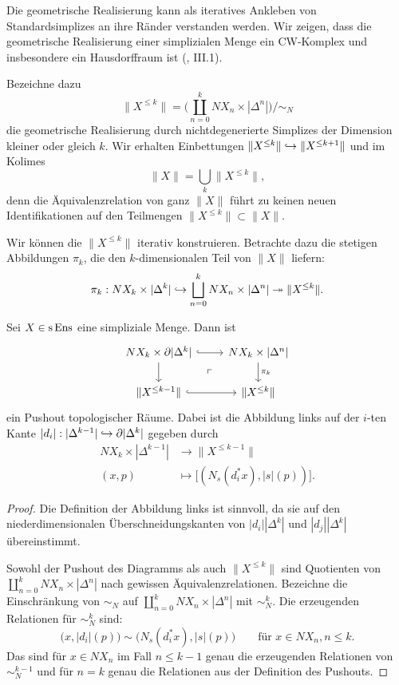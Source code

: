 Die geometrische Realisierung kann als iteratives Ankleben von
Standardsimplizes an ihre Ränder verstanden werden. Wir zeigen, dass
die geometrische Realisierung einer simplizialen Menge ein CW-Komplex
und insbesondere ein Hausdorffraum ist (\cite{Moer}, III.1).

Bezeichne dazu
\[ \|X^{\leq k}\| =
\bigg( \coprod_{n = 0}^k NX_n \times |\Delta^n| \bigg) \big/ \sim_N \]
die geometrische Realisierung durch nichtdegenerierte Simplizes der
Dimension kleiner oder gleich $k$. Wir erhalten Einbettungen
$\|X^{\leq k}\| \hookrightarrow \|X^{\leq k+1}\|$ und im Kolimes
\[ \|X\| = \bigcup_k \|X^{\leq k}\|, \]
denn die Äquivalenzrelation von ganz $\|X\|$ führt zu keinen neuen
Identifikationen auf den Teilmengen $\|X^{\leq k}\| \subset \|X\|$.

Wir können die $\|X^{\leq k}\|$ iterativ konstruieren. Betrachte dazu
die stetigen Abbildungen $\pi_k$, die den $k$-dimensionalen Teil von
$\|X\|$ liefern:
\[ \pi_k: NX_k \times |\Delta^k|
  \hookrightarrow \bigsqcup_{n=0}^k NX_n \times |\Delta^n|
  \twoheadrightarrow \|X^{\leq k}\|. \]

\begin{prop}
  Sei $X \in \operatorname{s}\operatorname{Ens}$ eine simpliziale Menge. Dann ist
  \[ \begin{tikzcd}
    NX_k \times \del |\Delta^k| \arrow[r, hook] \arrow[d]
    \arrow[dr, phantom, "\ulcorner"]
    & NX_k \times |\Delta^n| \arrow[d, "\pi_k"] \\
    \|X^{\leq k-1}\| \arrow[r, hook]
    & \|X^{\leq k}\|
  \end{tikzcd} \]
  ein Pushout topologischer Räume. Dabei ist die Abbildung links auf
  der $i$-ten Kante $|d_i|: |\Delta^{k-1}| \hookrightarrow \partial |\Delta^k|$
  gegeben durch
  \begin{align*}
    NX_k \times |\Delta^{k-1}| &\to \|X^{\leq k-1}\| \\
    (x, p) &\mapsto \big[ (N_s(d_i^* x), |s|(p)) \big].
  \end{align*}
\end{prop}
\begin{proof}
  Die Definition der Abbildung links ist sinnvoll, da sie auf den
  niederdimensionalen Überschneidungskanten von $|d_i| |\Delta^k|$ und
  $|d_j| |\Delta^k|$ übereinstimmt.
  
  Sowohl der Pushout des Diagramms als auch $\|X^{\leq k}\|$ sind
  Quotienten von $\coprod_{n=0}^k NX_n \times |\Delta^n|$ nach
  gewissen Äquivalenzrelationen. Bezeichne die Einschränkung von
  $\sim_N$ auf $\coprod_{n=0}^k NX_n \times |\Delta^n|$ mit
  $\sim_N^k$. Die erzeugenden Relationen für $\sim_N^k$ sind:
  \[ \big( x, |d_i|(p) \big) \sim \big( N_s(d_i^* x), |s|(p) \big)
  \qquad \text{für } x \in NX_n, n \leq k.
  \]
  Das sind für $x \in NX_n$ im Fall $n \leq k-1$ genau die erzeugenden
  Relationen von $\sim_N^{k-1}$ und für $n = k$ genau die Relationen
  aus der Definition des Pushouts.
\end{proof}

